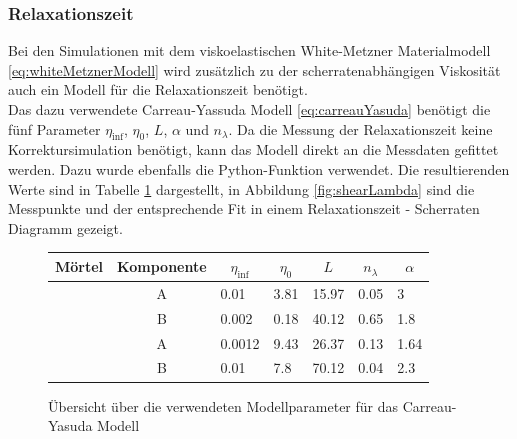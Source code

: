 \subsubsection{Relaxationszeit}
Bei den Simulationen mit dem viskoelastischen White-Metzner Materialmodell \eqref{eq:whiteMetznerModell} wird zusätzlich zu der scherratenabhängigen Viskosität auch ein Modell für die Relaxationszeit benötigt.\\
Das dazu verwendete Carreau-Yassuda Modell \eqref{eq:carreauYasuda} benötigt die fünf Parameter $\eta_{\inf}$, $\eta_0$, $L$, $\alpha$ und $n_{\lambda}$. Da die Messung der Relaxationszeit keine Korrektursimulation benötigt, kann das Modell direkt an die Messdaten gefittet werden.
Dazu wurde ebenfalls die Python-Funktion  verwendet. Die resultierenden Werte sind in Tabelle \ref{fig:relaxParameter} dargestellt, in Abbildung \ref{fig:shearLambda} sind die Messpunkte und der entsprechende Fit in einem Relaxationszeit - Scherraten Diagramm gezeigt.
\begin{figure}
    \centering
    \begin{tabular}{l c l l l l l}
        \textbf{Mörtel} & 
        \textbf{Komponente} & 
        \multicolumn{1}{c}{$\eta_{\inf}$} & 
        \multicolumn{1}{c}{$\eta_0$} &
        \multicolumn{1}{c}{$L$} & 
        \multicolumn{1}{c}{$n_{\lambda}$} & 
        \multicolumn{1}{c}{$\alpha$} \\
        \hline
        \hline
        \multirow{2}{*}{\hit{}} & A & 0.01   & 3.81  & 15.97 & 0.05 & 3       \\ 
                                & B & 0.002  & 0.18  & 40.12 & 0.65 & 1.8     \\ 
        \hline
        \multirow{2}{*}{\re{}}  & A & 0.0012 & 9.43 & 26.37  & 0.13 & 1.64    \\ 
                                & B & 0.01   & 7.8  & 70.12  & 0.04 & 2.3         
    \end{tabular}
    \caption{Übersicht über die verwendeten Modellparameter für das Carreau-Yasuda Modell}
    \label{fig:relaxParameter}
\end{figure}
%
